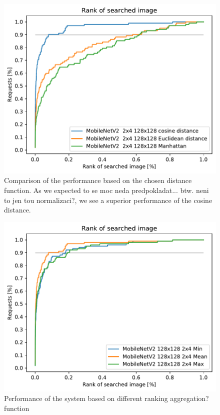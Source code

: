 \begin{figure}
    \centering
    \includegraphics[width=0.8\linewidth]{graphs/3aab502ea602a9f49afaa0a0d998cf226a0a67b9efcaa655d2ddf5063eeabe47.pdf}
    \caption{Comparison of the performance based on the chosen distance function. As we expected {\color{red} to se moc neda predpokladat... btw. neni to jen tou normalizaci?}, we see a superior performance of the cosine distance.}
    \label{fig:regions_distances}
\end{figure}

\begin{figure}
\centering
\includegraphics[width=0.8\linewidth]{graphs/70c56dc52be92e048f57b9bdfb35ddce2be41fd2454ae360588da2e387b09de5.pdf}
\caption{Performance of the system based on different ranking {\color{red} aggregation?} function}
\label{fig:ranking_funcs}
\end{figure}

